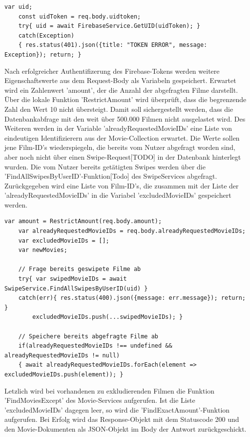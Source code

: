\begin{lstlisting}[caption=Controller Firebase-Authentifizierung, label=lst:controllerfirebaseauth]
    var uid; 
    const uidToken = req.body.uidtoken;
    try{ uid = await FirebaseService.GetUID(uidToken); }
    catch(Exception)
    { res.status(401).json({title: "TOKEN ERROR", message: Exception}); return; }
\end{lstlisting}

\noindent
Nach erfolgreicher Authentifizerung des Firebase-Tokens werden weitere Eigenschaftswerte aus dem Request-Body als Variabeln gespeichert. Erwartet wird ein Zahlenwert 'amount', der die Anzahl der abgefragten Filme darstellt. Über die lokale Funktion 'RestrictAmount' wird überprüft, dass die begrenzende Zahl den Wert 10 nicht übersteigt. Damit soll sichergestellt werden, dass die Datenbankabfrage mit den weit über 500.000 Filmen nicht ausgelastet wird. Des Weiteren werden in der Variable 'alreadyRequestedMovieIDs' eine Liste von   eindeutigen Identifizierern aus der Movie-Collection erwartet. Die Werte sollen jene Film-ID's wiederspiegeln, die bereits vom Nutzer abgefragt worden sind, aber noch nicht über einen Swipe-Request[TODO] in der Datenbank hinterlegt wurden. Die vom Nutzer bereits getätigten Swipes werden über die 'FindAllSwipesByUserID'-Funktion[Todo] des SwipeServices abgefragt. Zurück\-gegeben wird eine Liste von Film-ID's, die zusammen mit der Liste der 'alreadyRequestedMovieIDs' in die Variabel 'excludedMovieIDs' gespeichert werden.

\begin{lstlisting}[caption=MovieController - RequestMovie - Excluded Movies, label=lst:MovieControllerExcludedMovies]
    var amount = RestrictAmount(req.body.amount);
    var alreadyRequestedMovieIDs = req.body.alreadyRequestedMovieIDs;
    var excludedMovieIDs = [];
    var newMovies;
    
    // Frage bereits geswipete Filme ab
    try{ var swipedMovieIDs = await SwipeService.FindAllSwipesByUserID(uid) }
    catch(err){ res.status(400).json({message: err.message}); return; }
        excludedMovieIDs.push(...swipedMovieIDs); }

    // Speichere bereits abgefragte Filme ab
    if(alreadyRequestedMovieIDs !== undefined && alreadyRequestedMovieIDs != null)
    { await alreadyRequestedMovieIDs.forEach(element => excludedMovieIDs.push(element)); }
\end{lstlisting}

\noindent
Letzlich wird bei vorhandenen zu exkludierenden Filmen die Funktion 'FindMoviesExcept' des Movie-Services aufgerufen.  Ist die Liste 'excludedMovieIDs' dagegen leer, so wird die 'Find\-ExactAmount'-Funktion aufgerufen. Bei Erfolg wird das Response-Objekt mit dem Statuscode 200 und den Movie-Dokumenten als JSON-Objekt im Body der Antwort zurückgeschickt.

